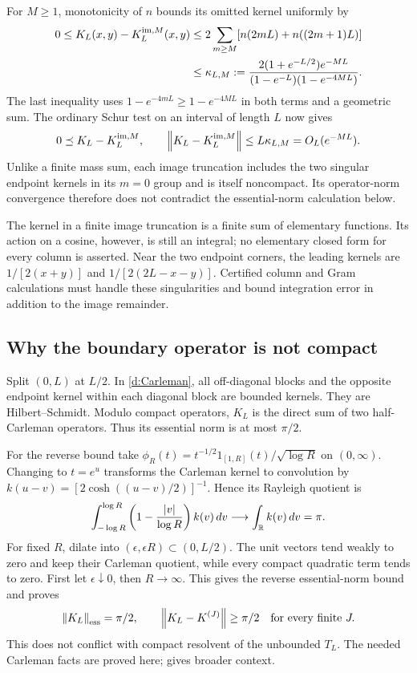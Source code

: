 For $M\ge1$, monotonicity of $n$ bounds its omitted kernel uniformly by
\begin{align}
0\le K_L(x,y)-K_L^{\mathrm{im},M}(x,y)
&\le2\sum_{m\ge M}[n(2mL)+n((2m+1)L)]\notag\\
&\le\kappa_{L,M}:=
\frac{2(1+e^{-L/2})e^{-ML}}
{(1-e^{-L})(1-e^{-4ML})}.\label{d:image-tail}
\end{align}
The last inequality uses
$1-e^{-4mL}\ge1-e^{-4ML}$ in both terms and a geometric sum.
The ordinary Schur test on an interval of length $L$ now gives
\begin{equation}\label{d:image-norm}
0\preceq K_L-K_L^{\mathrm{im},M},\qquad
\left\lVert K_L-K_L^{\mathrm{im},M}\right\rVert\le L\kappa_{L,M}=O_L(e^{-ML}).
\end{equation}
Unlike a finite mass sum, each image truncation includes the two singular
endpoint kernels in its $m=0$ group and is itself noncompact. Its
operator-norm convergence therefore does not contradict the essential-norm
calculation below.

The kernel in a finite image truncation is a finite sum of elementary
functions. Its action on a cosine, however, is still an integral; no
elementary closed form for every column is asserted. Near the two endpoint
corners, the leading kernels are $1/[2(x+y)]$ and $1/[2(2L-x-y)]$.
Certified column and Gram calculations must handle these singularities
and bound integration error in addition to the image remainder.

\subsection{Why the boundary operator is not compact}
Split $(0,L)$ at $L/2$. In \eqref{d:Carleman}, all off-diagonal blocks and
the opposite endpoint kernel within each diagonal block are bounded kernels.
They are Hilbert--Schmidt. Modulo compact operators, $K_L$ is the direct
sum of two half-Carleman operators. Thus its essential norm is at most
$\pi/2$.

For the reverse bound take
$\phi_R(t)=t^{-1/2}1_{[1,R]}(t)/\sqrt{\log R}$ on $(0,\infty)$.
Changing to $t=e^u$ transforms the Carleman kernel to convolution by
$k(u-v)=[2\cosh((u-v)/2)]^{-1}$. Hence its Rayleigh quotient is
\[
\int_{-\log R}^{\log R}
\left(1-\frac{|v|}{\log R}\right)k(v)\,dv\longrightarrow
\int_\mathbb R k(v)\,dv=\pi.
\]
For fixed $R$, dilate into $(\epsilon,\epsilon R)\subset(0,L/2)$.
The unit vectors tend weakly to zero and keep their Carleman quotient,
while every compact quadratic term tends to zero. First let
$\epsilon\downarrow0$, then $R\to\infty$. This gives the reverse
essential-norm bound and proves
\[
\left\lVert K_L\right\rVert_{\rm ess}=\pi/2,\qquad
\left\lVert K_L-K^{(J)}\right\rVert\ge\pi/2\quad\text{for every finite }J.
\]
This does not conflict with compact resolvent of the unbounded $T_L$.
The needed Carleman facts are proved here; \cite{Yafaev} gives broader context.

